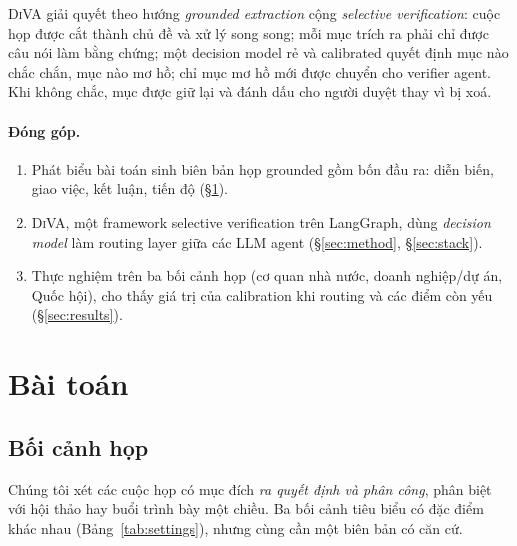 \documentclass[11pt]{article}
\newcommand{\diva}{\textsc{DiVA}}
\begin{document}
\diva{} giải quyết theo hướng \emph{grounded extraction} cộng \emph{selective verification}: cuộc họp được
cắt thành chủ đề và xử lý song song; mỗi mục trích ra phải chỉ được câu nói làm bằng chứng; một decision
model rẻ và calibrated quyết định mục nào chắc chắn, mục nào mơ hồ; chỉ mục mơ hồ mới được chuyển cho
verifier agent. Khi không chắc, mục được giữ lại và đánh dấu cho người duyệt thay vì bị xoá.

\paragraph{Đóng góp.}
\begin{enumerate}
  \item Phát biểu bài toán sinh biên bản họp grounded gồm bốn đầu ra: diễn biến, giao việc, kết luận,
        tiến độ (\S\ref{sec:problem}).
  \item \diva{}, một framework selective verification trên LangGraph, dùng \emph{decision model} làm
        routing layer giữa các LLM agent (\S\ref{sec:method}, \S\ref{sec:stack}).
  \item Thực nghiệm trên ba bối cảnh họp (cơ quan nhà nước, doanh nghiệp/dự án, Quốc hội), cho thấy giá
        trị của calibration khi routing và các điểm còn yếu (\S\ref{sec:results}).
\end{enumerate}

\section{Bài toán}
\label{sec:problem}

\subsection{Bối cảnh họp}

Chúng tôi xét các cuộc họp có mục đích \emph{ra quyết định và phân công}, phân biệt với hội thảo hay buổi
trình bày một chiều. Ba bối cảnh tiêu biểu có đặc điểm khác nhau (Bảng~\ref{tab:settings}), nhưng cùng
cần một biên bản có căn cứ.
\end{document}
